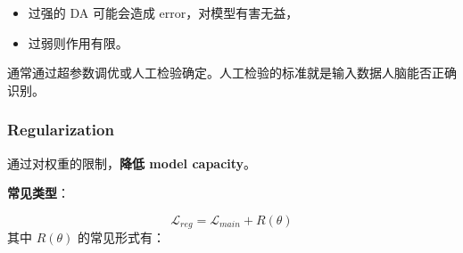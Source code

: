 \begin{itemize}
\tightlist
\item
  过强的 DA 可能会造成 error，对模型有害无益，
\item
  过弱则作用有限。
\end{itemize}

通常通过超参数调优或人工检验确定。人工检验的标准就是输入数据人脑能否正确识别。

\subsubsection{Regularization}\label{regularization}

通过对权重的限制，\textbf{降低 model capacity}。

\textbf{常见类型}：

\[
\mathcal{L}_{reg} = \mathcal{L}_{main} + R(\theta)
\] 其中 \(R(\theta)\) 的常见形式有：

